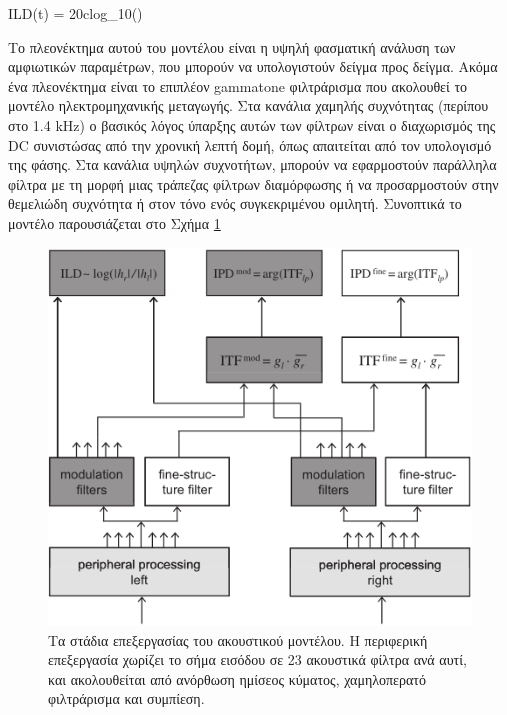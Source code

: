 \begin{CEquation}
    ILD(t) = 20clog_{10}()
    \label{eq:ILD_calc}
\end{CEquation}

Το πλεονέκτημα αυτού του μοντέλου είναι η υψηλή φασματική ανάλυση των αμφιωτικών παραμέτρων, που μπορούν να υπολογιστούν δείγμα προς δείγμα. Ακόμα ένα πλεονέκτημα είναι το επιπλέον gammatone φιλτράρισμα που ακολουθεί το μοντέλο ηλεκτρομηχανικής μεταγωγής. Στα κανάλια χαμηλής συχνότητας (περίπου στο 1.4 kHz) ο βασικός λόγος ύπαρξης αυτών των φίλτρων είναι ο διαχωρισμός της DC συνιστώσας από την χρονική λεπτή δομή, όπως απαιτείται από τον υπολογισμό της φάσης. Στα κανάλια υψηλών συχνοτήτων, μπορούν να εφαρμοστούν παράλληλα φίλτρα με τη μορφή μιας τράπεζας φίλτρων διαμόρφωσης ή να προσαρμοστούν στην θεμελιώδη συχνότητα ή στον τόνο ενός συγκεκριμένου ομιλητή. Συνοπτικά το μοντέλο παρουσιάζεται στο Σχήμα \ref{fig:dietz_model_structure}

\begin{figure}[h]
  \centering
  \includegraphics[width=\textwidth]{images/dietz_model_structure.png}
  \caption{Τα στάδια επεξεργασίας του ακουστικού μοντέλου. Η περιφερική επεξεργασία χωρίζει το σήμα εισόδου σε 23 ακουστικά φίλτρα ανά αυτί, και ακολουθείται από ανόρθωση ημίσεος κύματος, χαμηλοπερατό φιλτράρισμα και συμπίεση.}
  \label{fig:dietz_model_structure}
\end{figure}